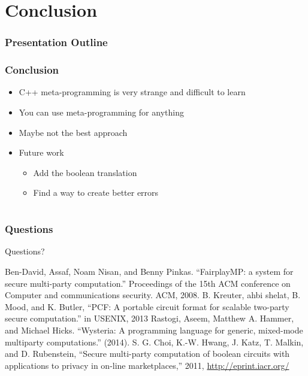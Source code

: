\documentclass{beamer}
\begin{document}
\section{Conclusion}

\begin{frame}[fragile]
\frametitle{Presentation Outline}
\tableofcontents[currentsection]
\end{frame}

\begin{frame}
\frametitle{Conclusion}
\begin{itemize}
\item C++ meta-programming is very strange and difficult to learn
\item You can use meta-programming for anything
\item Maybe not the best approach
\item Future work
\begin{itemize}
\item Add the boolean translation
\item Find a way to create better errors
\end{itemize}
\end{itemize}
\end{frame}

\section*{}
\begin{frame}
\frametitle{Questions}
Questions?
\end{frame}

\begin{frame}
\begin{thebibliography}{9}
Ben-David, Assaf, Noam Nisan, and Benny Pinkas. ``FairplayMP: a system for secure multi-party computation.'' Proceedings of the 15th ACM conference on Computer and communications security. ACM, 2008.
 B. Kreuter, ahbi shelat, B. Mood, and K. Butler, ``PCF: A portable
circuit format for scalable two-party secure computation.'' in USENIX,
2013
Rastogi, Aseem, Matthew A. Hammer, and Michael Hicks. ``Wysteria: A programming language for generic, mixed-mode multiparty computations.'' (2014).
S. G. Choi, K.-W. Hwang, J. Katz, T. Malkin, and D. Rubenstein,
“Secure multi-party computation of boolean circuits with applications to
privacy in on-line marketplaces,” 2011, \url{http://eprint.iacr.org/}
\end{thebibliography}
\end{frame}
\end{document}
